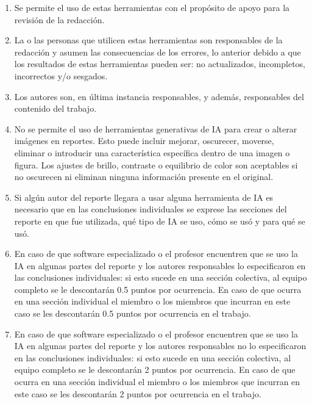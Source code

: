 \documentclass{article}
\begin{document}
\begin{enumerate}
\item Se permite el uso de estas herramientas con el propósito de apoyo para la revisión de la redacción.

\item La o las personas que utilicen estas herramientas son responsables de la redacción y asumen las consecuencias de los errores, lo anterior debido a que los resultados de estas herramientas pueden ser: no actualizados, incompletos, incorrectos y/o sesgados.

\item Los autores son, en última instancia responsables, y además, responsables del contenido del trabajo.

\item No se permite el uso de herramientas generativas de IA para crear o alterar imágenes en reportes. Esto puede incluir mejorar, oscurecer, moverse, eliminar o introducir una característica específica dentro de una imagen o figura. Los ajustes de brillo, contraste o equilibrio de color son aceptables si no oscurecen ni eliminan ninguna información presente en el original.

\item Si algún autor del reporte llegara a usar alguna herramienta de IA es necesario que en las conclusiones individuales se exprese las secciones del reporte en que fue utilizada, qué tipo de IA se uso, cómo se usó y para qué se usó.

\item En caso de que software especializado o el profesor encuentren que se uso la IA en algunas partes del reporte y los autores responsables lo especificaron en las conclusiones individuales: si esto sucede en una sección colectiva, al equipo completo se le descontarán 0.5 puntos por ocurrencia. En caso de que ocurra en una sección individual el miembro o los miembros que incurran en este caso se les descontarán 0.5 puntos por ocurrencia en el trabajo. 

\item En caso de que software especializado o el profesor encuentren que se uso la IA en algunas partes del reporte y los autores responsables no lo especificaron en las conclusiones individuales: si esto sucede en una sección colectiva, al equipo completo se le descontarán 2 puntos por ocurrencia. En caso de que ocurra en una sección individual el miembro o los miembros que incurran en este caso se les descontarán 2 puntos por ocurrencia en el trabajo. 

\end{enumerate} 
\end{document}
